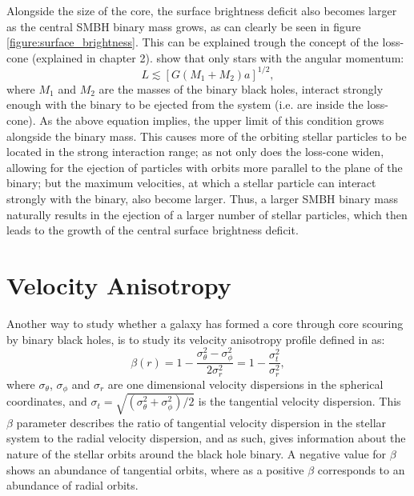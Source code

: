 \documentclass[english, oneside]{HYgradu}
\begin{document}
Alongside the size of the core, the surface brightness deficit also becomes larger as the central SMBH binary mass grows, as can clearly be seen in figure \ref{figure:surface_brightness}. This can be explained trough the concept of the loss-cone (explained in chapter 2). \cite{BinneyTremaine} show that only stars with the angular momentum:
\begin{equation}
L \lesssim [G(M_1 + M_2)a]^{1/2}, \label{eq:loss-cone}
\end{equation}
where $M_1$ and $M_2$ are the masses of the binary black holes, interact strongly enough with the binary to be ejected from the system (i.e. are inside the loss-cone). As the above equation implies, the upper limit of this condition grows alongside the binary mass. This causes more of the orbiting stellar particles to be located in the strong interaction range; as not only does the loss-cone widen, allowing for the ejection of particles with orbits more parallel to the plane of the binary; but the maximum velocities, at which a stellar particle can interact strongly with the binary, also become larger. Thus, a larger SMBH binary mass naturally results in the ejection of a larger number of stellar particles, which then leads to the growth of the central surface brightness deficit.  

\section{Velocity Anisotropy}


Another way to study whether a galaxy has formed a core through core scouring by binary black holes, is to study its velocity anisotropy profile defined in \cite{BinneyTremaine} as:
\begin{equation}
\beta(r) = 1 - \frac{\sigma_\theta^2 - \sigma_\phi^2}{2\sigma_r^2} = 1 - \frac{\sigma_t^2}{\sigma_r^2}, \label{eq:beta}
\end{equation}
where $\sigma_\theta$, $\sigma_\phi$ and $\sigma_r$ are one dimensional velocity dispersions in the spherical coordinates, and $\sigma_t = \sqrt{(\sigma_\theta^2 + \sigma_\phi^2) / 2}$ is the tangential velocity dispersion. This $\beta$ parameter describes the ratio of tangential velocity dispersion in the stellar system to the radial velocity dispersion, and as such, gives information about the nature of the stellar orbits around the black hole binary. A negative value for $\beta$ shows an abundance of tangential orbits, where as a positive $\beta$ corresponds to an abundance of radial orbits. 
\end{document}
